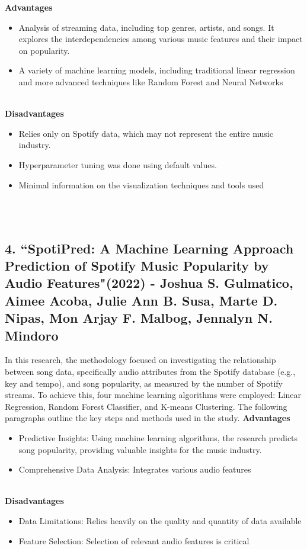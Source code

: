\documentclass[11pt]{report}
\begin{document}
\textbf{Advantages}
    \begin{itemize}
        \item Analysis of streaming data, including top genres, artists, and songs. It explores the interdependencies among various music features and their impact on popularity.
        \item A variety of machine learning models, including traditional linear regression and more advanced techniques like Random Forest and Neural Networks
    \end{itemize}
\\  
    \textbf{Disadvantages}
    \begin{itemize}
        \item Relies only on Spotify data, which may not represent the entire music industry.
        \item Hyperparameter tuning was done using default values.
        \item Minimal information on the visualization techniques and tools used
    \end{itemize}
\\\\

\subsection*{4.  ``SpotiPred: A Machine Learning Approach Prediction of Spotify Music Popularity by Audio Features"(2022) - Joshua S. Gulmatico, Aimee Acoba, Julie Ann B. Susa, Marte D. Nipas, Mon Arjay F. Malbog, Jennalyn N. Mindoro\cite{reference4}}
In this research, the methodology focused on investigating the relationship between song data, specifically audio attributes from the Spotify database (e.g., key and tempo), and song popularity, as measured by the number of Spotify streams. To achieve this, four machine learning algorithms were employed: Linear Regression, Random Forest Classifier, and K-means Clustering. The following paragraphs outline the key steps and methods used in the study. 
\clearpage
\textbf{Advantages}
    \begin{itemize}
        \item Predictive Insights: Using machine learning algorithms, the research predicts song popularity, providing valuable insights for the music industry.
        \item Comprehensive Data Analysis: Integrates various audio features
    \end{itemize}
\\       
    \textbf{Disadvantages}
    \begin{itemize}
        \item Data Limitations: Relies heavily on the quality and quantity of data available
        \item Feature Selection: Selection of relevant audio features is critical
    \end{itemize}
\\\\
\end{document}

